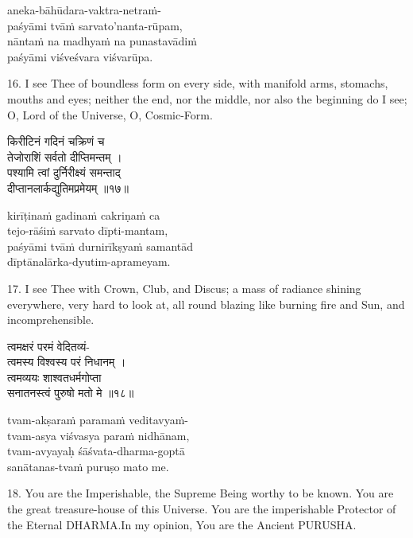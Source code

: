 \begin{transliteration}
aneka-bāhūdara-vaktra-netraṁ- \\
\tab paśyāmi tvāṁ sarvato'nanta-rūpam, \\
nāntaṁ na madhyaṁ na punastavādiṁ \\
\tab paśyāmi viśveśvara viśvarūpa.
\end{transliteration}

16. I see Thee of boundless form on every side, with manifold arms, stomachs,
mouths and eyes; neither the end, nor the middle, nor also the beginning do I
see; O, Lord of the Universe, O, Cosmic-Form.

\begin{gitaverse}
किरीटिनं गदिनं चक्रिणं च \\
\tab तेजोराशिं सर्वतो दीप्तिमन्तम् । \\
पश्यामि त्वां दुर्निरीक्ष्यं समन्ताद् \\
\tab दीप्तानलार्कद्युतिमप्रमेयम् ॥१७॥
\end{gitaverse}

\begin{transliteration}
kirīṭinaṁ gadinaṁ cakriṇaṁ ca \\
\tab tejo-rāśiṁ sarvato dīpti-mantam, \\
paśyāmi tvāṁ durnirīkṣyaṁ samantād \\
\tab dīptānalārka-dyutim-aprameyam.
\end{transliteration}

17. I see Thee with Crown, Club, and Discus; a mass of radiance shining
everywhere, very hard to look at, all round blazing like burning fire and Sun,
and incomprehensible.

\begin{gitaverse}
त्वमक्षरं परमं वेदितव्यं- \\
\tab त्वमस्य विश्वस्य परं निधानम् । \\
त्वमव्ययः शाश्वतधर्मगोप्ता \\
\tab सनातनस्त्वं पुरुषो मतो मे ॥१८॥
\end{gitaverse}

\begin{transliteration}
tvam-akṣaraṁ paramaṁ veditavyaṁ- \\
\tab tvam-asya viśvasya paraṁ nidhānam, \\
tvam-avyayaḥ śāśvata-dharma-goptā \\
\tab sanātanas-tvaṁ puruṣo mato me.
\end{transliteration}

18. You are the Imperishable, the Supreme Being worthy to be known. You are the
great treasure-house of this Universe. You are the imperishable Protector of
the Eternal DHARMA.\@ In my opinion, You are the Ancient PURUSHA.\@

